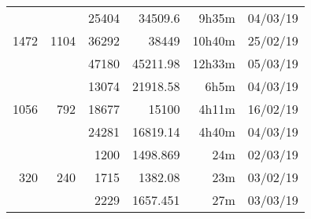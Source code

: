\begin{center}
\begin{tabular}{ r r r | r r r }
  \hline
  \multirow{3}{*}{1472} & \multirow{3}{*}{1104} & 25404 & 34509.6 & 9h35m & 04/03/19 \\
  & & 36292 & 38449 & 10h40m & 25/02/19 \\
  & & 47180 & 45211.98 & 12h33m & 05/03/19 \\
  \hline
  \multirow{3}{*}{1056} & \multirow{3}{*}{792} & 13074 & 21918.58 & 6h5m & 04/03/19 \\
  & & 18677 & 15100 & 4h11m & 16/02/19 \\
  & & 24281 & 16819.14 & 4h40m & 04/03/19 \\
  \hline
  \multirow{3}{*}{320} & \multirow{3}{*}{240} & 1200 & 1498.869 & 24m & 02/03/19 \\
  & & 1715 & 1382.08 & 23m & 03/02/19 \\
  & & 2229 & 1657.451 & 27m & 03/03/19 \\
  \end{tabular}
  \end{center}

\newpage
